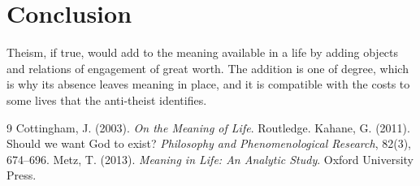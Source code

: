 \documentclass{situationist-preprint}
\begin{document}
\section{Conclusion}

Theism, if true, would add to the meaning available in a life by adding objects and relations of engagement of great worth. The addition is one of degree, which is why its absence leaves meaning in place, and it is compatible with the costs to some lives that the anti-theist identifies.

\begin{thebibliography}{9}\small
{} Cottingham, J. (2003). \emph{On the Meaning of Life}. Routledge.
 Kahane, G. (2011). Should we want God to exist? \emph{Philosophy and Phenomenological Research}, 82(3), 674--696.
 Metz, T. (2013). \emph{Meaning in Life: An Analytic Study}. Oxford University Press.
\end{thebibliography}
\end{document}
